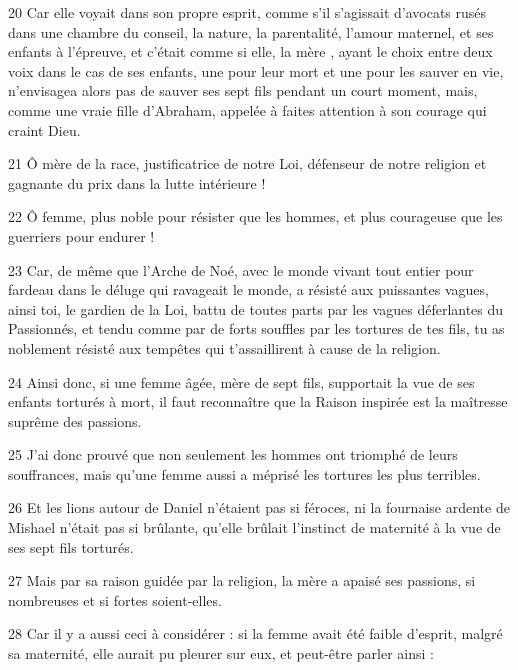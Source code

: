 \par 20 Car elle voyait dans son propre esprit, comme s'il s'agissait d'avocats rusés dans une chambre du conseil, la nature, la parentalité, l'amour maternel, et ses enfants à l'épreuve, et c'était comme si elle, la mère , ayant le choix entre deux voix dans le cas de ses enfants, une pour leur mort et une pour les sauver en vie, n'envisagea alors pas de sauver ses sept fils pendant un court moment, mais, comme une vraie fille d'Abraham, appelée à faites attention à son courage qui craint Dieu.

\par 21 Ô mère de la race, justificatrice de notre Loi, défenseur de notre religion et gagnante du prix dans la lutte intérieure !

\par 22 Ô femme, plus noble pour résister que les hommes, et plus courageuse que les guerriers pour endurer !

\par 23 Car, de même que l'Arche de Noé, avec le monde vivant tout entier pour fardeau dans le déluge qui ravageait le monde, a résisté aux puissantes vagues, ainsi toi, le gardien de la Loi, battu de toutes parts par les vagues déferlantes du Passionnés, et tendu comme par de forts souffles par les tortures de tes fils, tu as noblement résisté aux tempêtes qui t'assaillirent à cause de la religion.

\par 24 Ainsi donc, si une femme âgée, mère de sept fils, supportait la vue de ses enfants torturés à mort, il faut reconnaître que la Raison inspirée est la maîtresse suprême des passions.

\par 25 J'ai donc prouvé que non seulement les hommes ont triomphé de leurs souffrances, mais qu'une femme aussi a méprisé les tortures les plus terribles.

\par 26 Et les lions autour de Daniel n'étaient pas si féroces, ni la fournaise ardente de Mishael n'était pas si brûlante, qu'elle brûlait l'instinct de maternité à la vue de ses sept fils torturés.

\par 27 Mais par sa raison guidée par la religion, la mère a apaisé ses passions, si nombreuses et si fortes soient-elles.

\par 28 Car il y a aussi ceci à considérer : si la femme avait été faible d'esprit, malgré sa maternité, elle aurait pu pleurer sur eux, et peut-être parler ainsi :

